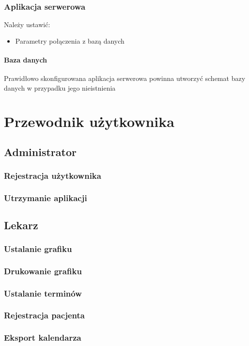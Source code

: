 \documentclass[polish,12pt]{aghthesis}
\begin{document}
\subsubsection{Aplikacja serwerowa}{Należy ustawić:
\begin{itemize}
    \item Parametry połączenia z bazą danych
\end{itemize}}
\paragraph{Baza danych}{Prawidłowo skonfigurowana aplikacja serwerowa powinna utworzyć schemat bazy danych w przypadku jego nieistnienia}

\section{Przewodnik użytkownika}
\subsection{Administrator}
\subsubsection{Rejestracja użytkownika}{}
\subsubsection{Utrzymanie aplikacji}{}
\subsection{Lekarz}
\subsubsection{Ustalanie grafiku}{}
\subsubsection{Drukowanie grafiku}{}
\subsubsection{Ustalanie terminów}{}
\subsubsection{Rejestracja pacjenta}{}
\subsubsection{Eksport kalendarza}{}
\end{document}
